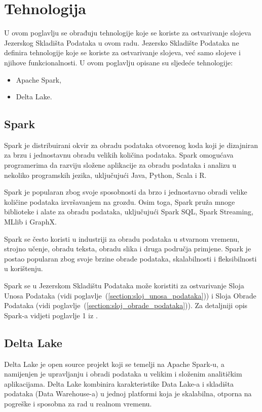 \chapter{Tehnologija} \label{chapter:tehnologija}
U ovom poglavlju se obrađuju tehnologije koje se koriste za ostvarivanje slojeva
Jezerskog Skladišta Podataka u ovom radu. Jezersko Skladište Podataka ne
definira tehnologije koje se koriste za ostvarivanje slojeva, već samo slojeve i
njihove funkcionalnosti. U ovom poglavlju opisane su sljedeće tehnologije:
\begin{itemize}
    \item Apache Spark,
    \item Delta Lake.    
\end{itemize}

\section{Spark} \label{section:spark}
Spark je distribuirani okvir za obradu podataka otvorenog koda koji je
dizajniran za brzu i jednostavnu obradu velikih količina podataka. Spark
omogućava programerima da razviju složene aplikacije za obradu podataka i
analizu u nekoliko programskih jezika, uključujući Java, Python, Scala i R.

Spark je popularan zbog svoje sposobnosti da brzo i jednostavno obradi velike
količine podataka izvršavanjem na grozdu. Osim toga, Spark pruža mnoge
biblioteke i alate za obradu podataka, uključujući Spark SQL, Spark Streaming,
MLlib i GraphX.

Spark se često koristi u industriji za obradu podataka u stvarnom vremenu,
strojno učenje, obradu teksta, obradu slika i druga područja primjene. Spark je
postao popularan zbog svoje brzine obrade podataka, skalabilnosti i
fleksibilnosti u korištenju. 

Spark se u Jezerskom Skladištu Podataka može koristiti za ostvarivanje Sloja
Unosa Podataka (vidi poglavlje~(\ref{section:sloj_unosa_podataka})) i Sloja
Obrade Podataka (vidi poglavlje~(\ref{section:sloj_obrade_podataka})). Za
detaljniji opis Spark-a vidjeti poglavlje 1 iz \cite{spark2020}.

\section{Delta Lake} \label{section:delta_lake}
Delta Lake je open source projekt koji se temelji na Apache Spark-u, a
namijenjen je upravljanju i obradi podataka u velikim i složenim analitičkim
aplikacijama. Delta Lake kombinira karakteristike Data Lake-a i skladišta
podataka (Data Warehouse-a) u jednoj platformi koja je skalabilna, otporna na
pogreške i sposobna za rad u realnom vremenu.

